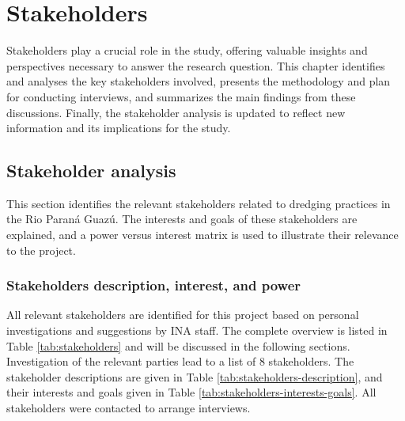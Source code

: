 \chapter{Stakeholders}
\label{chapter:stakeholders}
Stakeholders play a crucial role in the study, offering valuable insights and perspectives  necessary to answer the research question. This chapter identifies and analyses the key stakeholders involved, presents the methodology and plan for conducting interviews, and summarizes the main findings from these discussions. Finally, the stakeholder analysis is updated to reflect new information and its implications for the study.


\section{Stakeholder analysis} \label{par:stakeholderanalysis}
This section identifies the relevant stakeholders related to dredging practices in the Rio Paraná Guazú. The interests and goals of these stakeholders are explained, and a power versus interest matrix is used to illustrate their relevance to the project.

\subsection{Stakeholders description, interest, and power}
All relevant stakeholders are identified for this project based on personal investigations and suggestions by INA staff. The complete overview is listed in Table \ref{tab:stakeholders} and will be discussed in the following sections. Investigation of the relevant parties lead to a list of 8 stakeholders. The stakeholder descriptions are given in Table \ref{tab:stakeholders-description}, and their interests and goals given in Table \ref{tab:stakeholders-interests-goals}. All stakeholders were contacted to arrange interviews.

